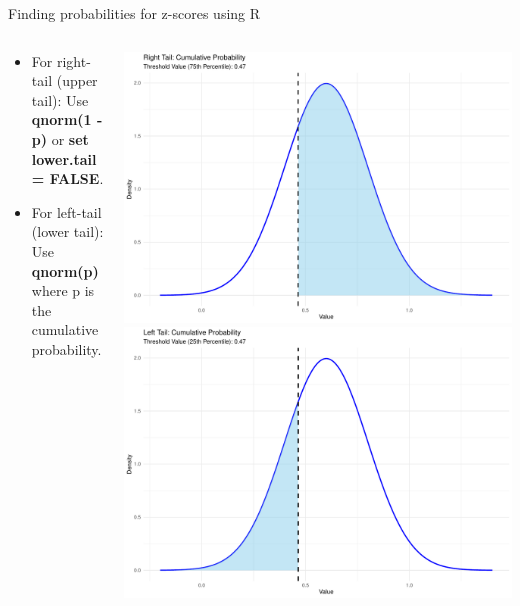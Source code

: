 \documentclass[
  ignorenonframetext,
]{beamer}
\providecommand{\tightlist}{%
  \setlength{\itemsep}{0pt}\setlength{\parskip}{0pt}}
\begin{document}
\begin{frame}{Finding probabilities for z-scores using R}
\label{finding-probabilities-for-z-scores-using-r-2}
\begin{columns}[T]
\begin{column}{0.5\textwidth}
\vspace{1cm}

\begin{itemize}
\tightlist
\item
  For right-tail (upper tail): Use \textbf{qnorm(1 - p)} or \textbf{set
  lower.tail = FALSE}.
\end{itemize}

\vspace{2cm}

\begin{itemize}
\tightlist
\item
  For left-tail (lower tail): Use \textbf{qnorm(p)} where p is the
  cumulative probability.
\end{itemize}
\end{column}

\begin{column}{0.5\textwidth}
\includegraphics{M5-Hypothesis-Testing,-Probability-and-Distribution_files/figure-beamer/unnamed-chunk-18-1.pdf}
\includegraphics{M5-Hypothesis-Testing,-Probability-and-Distribution_files/figure-beamer/unnamed-chunk-18-2.pdf}
\end{column}
\end{columns}
\end{frame}
\end{document}
